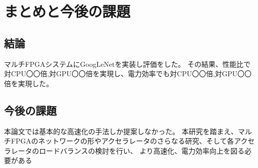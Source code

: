 \chapter{まとめと今後の課題}
{
\label{chap:conclusion}
\section{結論}
\label{sec:conclusion}
マルチFPGAシステムにGoogLeNetを実装し評価をした。
その結果、性能比で対CPU〇〇倍,対GPU〇〇倍を実現し、電力効率でも対CPU〇〇倍,対GPU〇〇倍を実現した。

\section{今後の課題}
\label{sec:future}
本論文では基本的な高速化の手法しか提案しなかった。
本研究を踏まえ、マルチFPGAのネットワークの形やアクセラレータのさらなる研究、そして各アクセラレータのロードバランスの検討を行い、
より高速化、電力効率向上を図る必要がある
}
